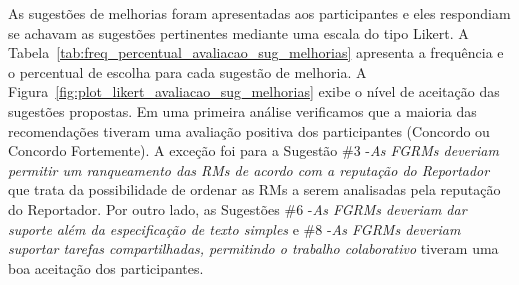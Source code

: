 As sugestões de melhorias foram apresentadas aos participantes e eles
respondiam se achavam as sugestões pertinentes mediante uma escala do tipo
Likert. A Tabela~\ref{tab:freq_percentual_avaliacao_sug_melhorias} apresenta a
frequência e o percentual de escolha para cada sugestão de melhoria. A
Figura~\ref{fig:plot_likert_avaliacao_sug_melhorias} exibe o nível de aceitação
das sugestões propostas. Em uma primeira análise verificamos que a maioria das
recomendações tiveram uma avaliação positiva dos participantes (Concordo ou
Concordo Fortemente). A exceção foi para a Sugestão \#3 \@-\@ \textit{As FGRMs
    deveriam permitir um ranqueamento das RMs de acordo com a reputação do
    Reportador} que trata da possibilidade de ordenar as RMs a serem analisadas
pela reputação do Reportador. Por outro lado, as Sugestões \#6 \@-\@ \textit{As
    FGRMs deveriam dar suporte além da especificação de texto simples}  e \#8
\@-\@ \textit{As FGRMs deveriam suportar tarefas compartilhadas, permitindo o
    trabalho colaborativo} tiveram uma boa aceitação dos participantes.

\begin{table}[htpb]
\centering
{}
\caption{Frequência e percentual das respostas sobre a relevância das sugestões de melhorias}\label{tab:freq_percentual_avaliacao_sug_melhorias}
\end{table}

